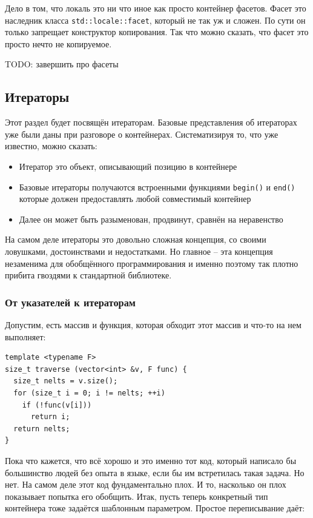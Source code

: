 \documentclass[a4paper,12pt,oneside]{article}
\begin{document}
Дело в том, что локаль это ни что иное как просто контейнер фасетов. Фасет это наследник класса \lstinline!std::locale::facet!, который не так уж и сложен. По сути он только запрещает конструктор копирования. Так что можно сказать, что фасет это просто нечто не копируемое.

TODO: завершить про фасеты

\pagebreak
\subsection{Итераторы}\label{Iterators}

Этот раздел будет посвящён итераторам. Базовые представления об итераторах уже были даны при разговоре о контейнерах. Систематизируя то, что уже известно, можно сказать:

\begin{itemize}
\item Итератор это объект, описывающий позицию в контейнере
\item Базовые итераторы получаются встроенными функциями \lstinline!begin()! и \lstinline!end()! которые должен предоставлять любой совместимый контейнер 
\item Далее он может быть разыменован, продвинут, сравнён на неравенство
\end{itemize}

На самом деле итераторы это довольно сложная концепция, со своими ловушками, достоинствами и недостатками. Но главное -- эта концепция незаменима для обобщённого программирования и именно поэтому так плотно прибита гвоздями к стандартной библиотеке.

\subsubsection{От указателей к итераторам}\label{PointersToIterators}

Допустим, есть массив и функция, которая обходит этот массив и что-то на нем выполняет:

\begin{lstlisting}
template <typename F>
size_t traverse (vector<int> &v, F func) {
  size_t nelts = v.size();
  for (size_t i = 0; i != nelts; ++i)
    if (!func(v[i]))
      return i;
  return nelts;
}
\end{lstlisting}

Пока что кажется, что всё хорошо и это именно тот код, который написало бы большинство людей без опыта в языке, если бы им встретилась такая задача. Но нет. На самом деле этот код фундаментально плох. И то, насколько он плох показывает попытка его обобщить. Итак, пусть теперь конкретный тип контейнера тоже задаётся шаблонным параметром. Простое переписывание даёт:
\end{document}
